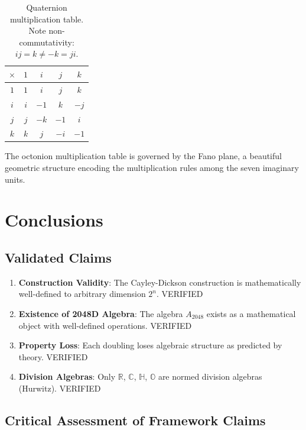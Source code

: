 \begin{table}[h]
\centering
\begin{tabular}{c|cccc}
\toprule
$\times$ & $1$ & $i$ & $j$ & $k$ \\
\midrule
$1$ & $1$ & $i$ & $j$ & $k$ \\
$i$ & $i$ & $-1$ & $k$ & $-j$ \\
$j$ & $j$ & $-k$ & $-1$ & $i$ \\
$k$ & $k$ & $j$ & $-i$ & $-1$ \\
\bottomrule
\end{tabular}
\caption{Quaternion multiplication table. Note non-commutativity: $ij = k \neq -k = ji$.}
\label{tab:quaternion_mult}
\end{table}

The octonion multiplication table is governed by the Fano plane, a beautiful geometric structure encoding the multiplication rules among the seven imaginary units.

\section{Conclusions}

\subsection{Validated Claims}

\begin{enumerate}
    \item \textbf{Construction Validity}: The Cayley-Dickson construction is mathematically well-defined to arbitrary dimension $2^n$. \textcolor{validcolor}{VERIFIED}

    \item \textbf{Existence of 2048D Algebra}: The algebra $A_{2048}$ exists as a mathematical object with well-defined operations. \textcolor{validcolor}{VERIFIED}

    \item \textbf{Property Loss}: Each doubling loses algebraic structure as predicted by theory. \textcolor{validcolor}{VERIFIED}

    \item \textbf{Division Algebras}: Only $\mathbb{R}$, $\mathbb{C}$, $\mathbb{H}$, $\mathbb{O}$ are normed division algebras (Hurwitz). \textcolor{validcolor}{VERIFIED}
\end{enumerate}

\subsection{Critical Assessment of Framework Claims}

